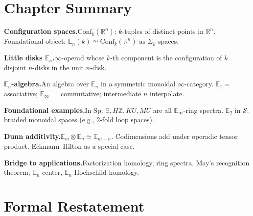\section*{Chapter Summary}

\begin{summarybox}
\textbf{Configuration spaces.}\quad $\mathrm{Conf}_k(\mathbb{R}^n)$:
$k$-tuples of distinct points in $\mathbb{R}^n$. Foundational object;
$\mathbb{E}_n(k) \simeq \mathrm{Conf}_k(\mathbb{R}^n)$ as $\Sigma_k$-spaces.

\textbf{Little disks $\mathbb{E}_n$.}\quad $\infty$-operad whose
$k$-th component is the configuration of $k$ disjoint $n$-disks in
the unit $n$-disk.

\textbf{$\mathbb{E}_n$-algebra.}\quad An algebra over $\mathbb{E}_n$ in
a symmetric monoidal $\infty$-category. $\mathbb{E}_1 = $ associative;
$\mathbb{E}_\infty = $ commutative; intermediate $n$ interpolate.

\textbf{Foundational examples.}\quad In $\mathrm{Sp}$: $\mathbb{S}, H\mathbb{Z},
KU, MU$ are all $\mathbb{E}_\infty$-ring spectra. $\mathbb{E}_2$ in
$\mathcal{S}$: braided monoidal spaces (e.g., $2$-fold loop spaces).

\textbf{Dunn additivity.}\quad $\mathbb{E}_m \otimes \mathbb{E}_n \simeq
\mathbb{E}_{m+n}$. Codimensions add under operadic tensor product.
Eckmann--Hilton as a special case.

\textbf{Bridge to applications.}\quad Factorization homology, ring
spectra, May's recognition theorem, $\mathbb{E}_n$-center,
$\mathbb{E}_n$-Hochschild homology.
\end{summarybox}


\section*{Formal Restatement}

